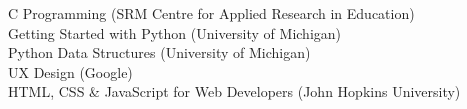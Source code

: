 \documentclass[]{plushcv}
\begin{document}
\begin{minipage}[t]{0.25\textwidth}
 \textbullet{} C Programming (SRM Centre for Applied Research in Education)\\ \textbullet{} Getting Started with Python (University of Michigan)\\ \textbullet{} Python Data Structures (University of Michigan) \\ \textbullet{} UX Design (Google) \\ \textbullet{} HTML, CSS \& JavaScript for Web Developers (John Hopkins University) \\
 \sectionsep



\end{minipage} 
\end{document}
